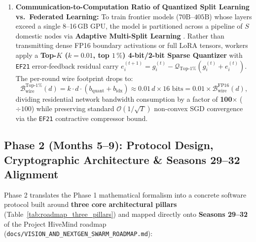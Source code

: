\documentclass[11pt,a4paper]{article}
\begin{document}
\begin{enumerate}[leftmargin=1.8em]
    \item \textbf{Communication-to-Computation Ratio of Quantized Split Learning vs.\ Federated Learning:}
    To train frontier models ($70\text{B}\text{--}405\text{B}$) whose layers exceed a single 8--16\,GB GPU, the model is partitioned across a pipeline of $S$ domestic nodes via \textbf{Adaptive Multi-Split Learning} \cite{gupta2018splitlearning}. Rather than transmitting dense FP16 boundary activations or full LoRA tensors, workers apply a \textbf{Top-$K$ ($k = 0.01$, top $1\,\%$) 4-bit/2-bit Sparse Quantizer} with \texttt{EF21} error-feedback residual carry $e_i^{(t+1)} = g_i^{(t)} - \mathcal{Q}_{\text{Top-}1\%}(g_i^{(t)} + e_i^{(t)})$. The per-round wire footprint drops to:
    \begin{equation}
        \mathcal{B}_{\text{wire}}^{\text{Top-}1\%}(d) = k \cdot d \cdot \left(b_{\text{quant}} + b_{\text{idx}}\right) \approx 0.01\,d \times 16\text{ bits} = 0.01 \times \mathcal{B}_{\text{wire}}^{\text{FP16}}(d),
    \end{equation}
    dividing residential network bandwidth consumption by a factor of \textbf{100$\times$} ($\div 100$) while preserving standard $\mathcal{O}(1/\sqrt{T})$ non-convex SGD convergence via the \texttt{EF21} contractive compressor bound.
\end{enumerate}

\subsection{Phase 2 (Months 5--9): Protocol Design, Cryptographic Architecture \& Seasons 29--32 Alignment}
\label{sec:roadmap_phase2}

Phase 2 translates the Phase 1 mathematical formalism into a concrete software protocol built around \textbf{three core architectural pillars} (Table~\ref{tab:roadmap_three_pillars}) and mapped directly onto \textbf{Seasons 29--32} of the Project HiveMind roadmap (\texttt{docs/\allowbreak VISION\_\allowbreak AND\_\allowbreak NEXTGEN\_\allowbreak SWARM\_\allowbreak ROADMAP.md}):
\end{document}
